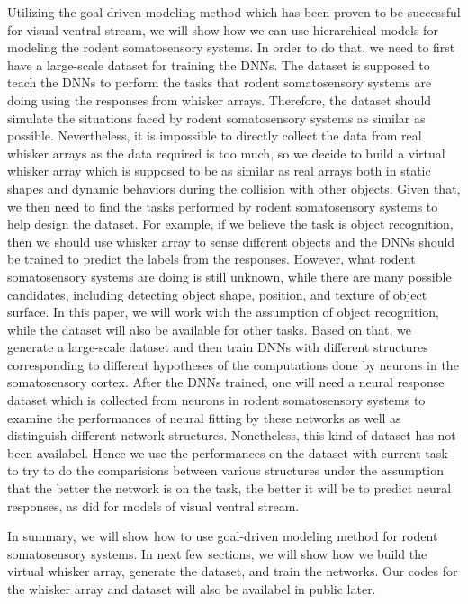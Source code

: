 Utilizing the goal-driven modeling method which has been proven to be successful for visual ventral stream, we will show how we can use hierarchical models for modeling the rodent somatosensory systems.
In order to do that, we need to first have a large-scale dataset for training the DNNs.
The dataset is supposed to teach the DNNs to perform the tasks that rodent somatosensory systems are doing using the responses from whisker arrays.
Therefore, the dataset should simulate the situations faced by rodent somatosensory systems as similar as possible. 
Nevertheless, it is impossible to directly collect the data from real whisker arrays as the data required is too much, so we decide to build a virtual whisker array which is supposed to be as similar as real arrays both in static shapes and dynamic behaviors during the collision with other objects.
Given that, we then need to find the tasks performed by rodent somatosensory systems to help design the dataset. 
For example, if we believe the task is object recognition, then we should use whisker array to sense different objects and the DNNs should be trained to predict the labels from the responses.
However, what rodent somatosensory systems are doing is still unknown, while there are many possible candidates, including detecting object shape, position, and texture of object surface\cite{Boubenec2012,Diamond2008,Arabzadeh2005,OConnor2010}.
In this paper, we will work with the assumption of object recognition, while the dataset will also be available for other tasks. 
Based on that, we generate a large-scale dataset and then train DNNs with different structures corresponding to different hypotheses of the computations done by neurons in the somatosensory cortex.
After the DNNs trained, one will need a neural response dataset which is collected from neurons in rodent somatosensory systems to examine the performances of neural fitting by these networks as well as distinguish different network structures.
Nonetheless, this kind of dataset has not been availabel. Hence we use the performances on the dataset with current task to try to do the comparisions between various structures under the assumption that the better the network is on the task, the better it will be to predict neural responses, as did for models of visual ventral stream.

In summary, we will show how to use goal-driven modeling method for rodent somatosensory systems. In next few sections, we will show how we build the virtual whisker array, generate the dataset, and train the networks. Our codes for the whisker array and dataset will also be availabel in public later.

